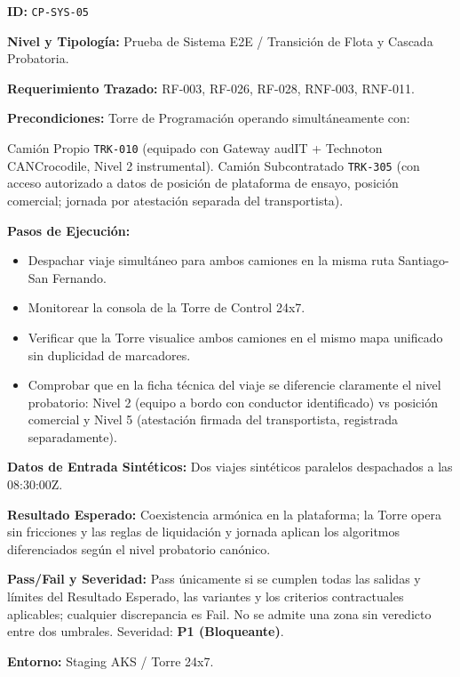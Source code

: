 \par\noindent\textbf{ID:} \texttt{CP-\allowbreak{}SYS-\allowbreak{}05}\par
\par\noindent\textbf{Nivel y Tipología:} Prueba de Sistema E2E / Transición de Flota y Cascada Probatoria.\par
\par\noindent\textbf{Requerimiento Trazado:} RF-003, RF-026, RF-028, RNF-003, RNF-011.\par
\par\noindent\textbf{Precondiciones:} Torre de Programación operando simultáneamente con:\par
Camión Propio \texttt{TRK-\allowbreak{}010} (equipado con Gateway audIT + Technoton CANCrocodile, Nivel 2 instrumental).
Camión Subcontratado \texttt{TRK-\allowbreak{}305} (con acceso autorizado a datos de posición de plataforma de ensayo, posición comercial; jornada por atestación separada del transportista).
\par\noindent\textbf{Pasos de Ejecución:}\par
\begin{itemize}
\item Despachar viaje simultáneo para ambos camiones en la misma ruta Santiago-San Fernando.
\item Monitorear la consola de la Torre de Control 24x7.
\item Verificar que la Torre visualice ambos camiones en el mismo mapa unificado sin duplicidad de marcadores.
\item Comprobar que en la ficha técnica del viaje se diferencie claramente el nivel probatorio: Nivel 2 (equipo a bordo con conductor identificado) vs posición comercial y Nivel 5 (atestación firmada del transportista, registrada separadamente).
\end{itemize}

\par\noindent\textbf{Datos de Entrada Sintéticos:} Dos viajes sintéticos paralelos despachados a las 08:30:00Z.\par
\par\noindent\textbf{Resultado Esperado:} Coexistencia armónica en la plataforma; la Torre opera sin fricciones y las reglas de liquidación y jornada aplican los algoritmos diferenciados según el nivel probatorio canónico.\par
\par\noindent\textbf{Pass/Fail y Severidad:} Pass únicamente si se cumplen todas las salidas y límites del Resultado Esperado, las variantes y los criterios contractuales aplicables; cualquier discrepancia es Fail. No se admite una zona sin veredicto entre dos umbrales. Severidad: \textbf{P1 (Bloqueante)}.\par
\par\noindent\textbf{Entorno:} Staging AKS / Torre 24x7.\par

